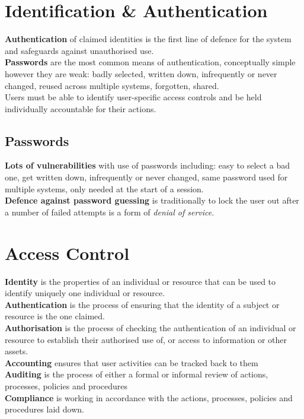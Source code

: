 \documentclass[a4paper,11pt]{article}
\begin{document}
\section{Identification \& Authentication}
\textbf{Authentication} of claimed identities is the first line of defence for the system and safeguards against unauthorised use.\\
\textbf{Passwords} are the most common means of authentication, conceptually simple however they are weak: badly selected, written down, infrequently or never changed, reused across multiple systems, forgotten, shared.\\
Users must be able to identify user-specific access controls and be held individually accountable for their actions.

\subsection{Passwords}
\textbf{Lots of vulnerabilities} with use of passwords including: easy to select a bad one, get written down, infrequently or never changed, same password used for multiple systems, only needed at the start of a session.\\
\textbf{Defence against password guessing} is traditionally to lock the user out after a number of failed attempts is a form of \textit{denial of service}. 

\section{Access Control}
\textbf{Identity} is the properties of an individual or resource that can be used to identify uniquely one individual or resource.\\
\textbf{Authentication} is the process of ensuring that the identity of a subject or resource is the one claimed.\\
\textbf{Authorisation} is the process of checking the authentication of an individual or resource to establish their authorised use of, or access to information or other assets.\\
\textbf{Accounting} ensures that user activities can be tracked back to them\\
\textbf{Auditing} is the process of either a formal or informal review of actions, processes, policies and procedures\\
\textbf{Compliance} is working in accordance with the actions, processes, policies and procedures laid down. 
\end{document}
